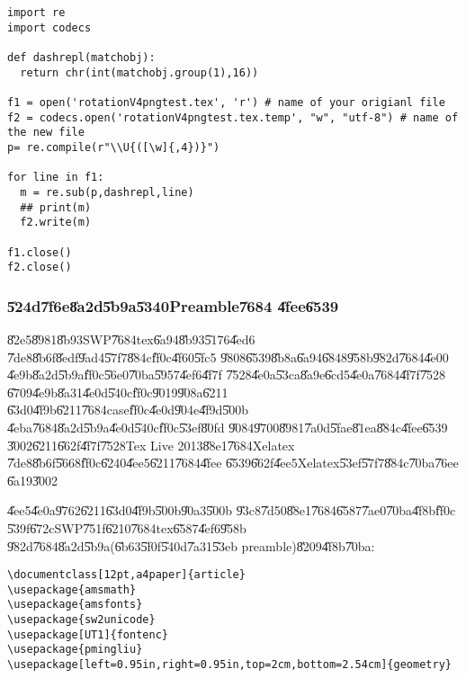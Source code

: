 \begin{mdframed}[leftline=false, rightline=false,backgroundcolor=bg]
\begin{verbatim}
import re
import codecs

def dashrepl(matchobj):
  return chr(int(matchobj.group(1),16))

f1 = open('rotationV4pngtest.tex', 'r') # name of your origianl file
f2 = codecs.open('rotationV4pngtest.tex.temp', "w", "utf-8") # name of the new file
p= re.compile(r"\\U{([\w]{,4})}")

for line in f1:
  m = re.sub(p,dashrepl,line)
  ## print(m)
  f2.write(m)

f1.close()
f2.close()
\end{verbatim}
\end{mdframed}

\subsubsection{\U{524d}\U{7f6e}\U{8a2d}\U{5b9a}\U{5340}Preamble\U{7684}%
\U{4fee}\U{6539}}

\U{82e5}\U{8981}\U{8b93}SWP\U{7684}tex\U{6a94}\U{8b93}\U{5176}\U{4ed6}%
\U{7de8}\U{8b6f}\U{8edf}\U{9ad4}\U{57f7}\U{884c}\U{ff0c}\U{4f60}\U{5fc5}%
\U{9808}\U{6539}\U{8b8a}\U{6a94}\U{6848}\U{958b}\U{982d}\U{7684}\U{4e00}%
\U{4e9b}\U{8a2d}\U{5b9a}\U{ff0c}\U{56e0}\U{70ba}\U{5957}\U{4ef6}\U{4f7f}%
\U{7528}\U{4e0a}\U{53ca}\U{8a9e}\U{6cd5}\U{4e0a}\U{7684}\U{4f7f}\U{7528}%
\U{6709}\U{4e9b}\U{8a31}\U{4e0d}\U{540c}\U{ff0c}\U{9019}\U{908a}\U{6211}%
\U{63d0}\U{4f9b}\U{6211}\U{7684}case\U{ff0c}\U{4e0d}\U{904e}\U{4f9d}\U{500b}%
\U{4eba}\U{7684}\U{8a2d}\U{5b9a}\U{4e0d}\U{540c}\U{ff0c}\U{53ef}\U{80fd}%
\U{9084}\U{9700}\U{8981}\U{7a0d}\U{5fae}\U{81ea}\U{884c}\U{4fee}\U{6539}%
\U{3002}\U{6211}\U{662f}\U{4f7f}\U{7528}Tex Live 2013\U{88e1}\U{7684}Xelatex%
\U{7de8}\U{8b6f}\U{5668}\U{ff0c}\U{6240}\U{4ee5}\U{6211}\U{7684}\U{4fee}%
\U{6539}\U{662f}\U{4ee5}Xelatex\U{53ef}\U{57f7}\U{884c}\U{70ba}\U{76ee}%
\U{6a19}\U{3002}

\U{4ee5}\U{4e0a}\U{9762}\U{6211}\U{63d0}\U{4f9b}\U{500b}\U{90a3}\U{500b}%
\U{93c8}\U{7d50}\U{88e1}\U{7684}\U{6587}\U{7ae0}\U{70ba}\U{4f8b}\U{ff0c}%
\U{539f}\U{672c}SWP\U{751f}\U{6210}\U{7684}tex\U{6587}\U{4ef6}\U{958b}%
\U{982d}\U{7684}\U{8a2d}\U{5b9a}(\U{6b63}\U{5f0f}\U{540d}\U{7a31}\U{53eb}%
preamble)\U{8209}\U{4f8b}\U{70ba}:

\begin{mdframed}[leftline=false, rightline=false,backgroundcolor=bg]
\begin{verbatim}
\documentclass[12pt,a4paper]{article}
\usepackage{amsmath}
\usepackage{amsfonts}
\usepackage{sw2unicode}
\usepackage[UT1]{fontenc}
\usepackage{pmingliu}
\usepackage[left=0.95in,right=0.95in,top=2cm,bottom=2.54cm]{geometry}
\end{verbatim}
\end{mdframed}

